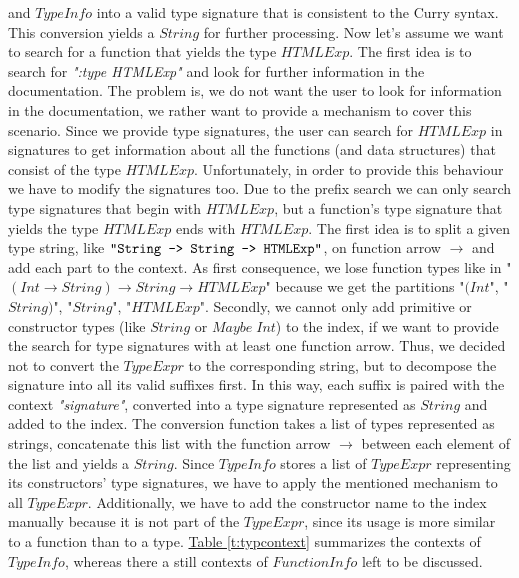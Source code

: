 \documentclass[%
	latex,%
	a4paper,%
	oneside,%
	chapterprefix,%
	headsepline,%
	12pt%
]{scrbook}
\newcommand{\textss}[1]{"#1"}
\newcommand{\Conid}[1]{\mathit{#1}}
\begin{document}
and \ensuremath{\Conid{TypeInfo}} into a valid type signature that is consistent to the
Curry syntax. %
This conversion yields a \ensuremath{\Conid{String}} for further processing. %
Now let's assume we want to search for a function that yields the type
\ensuremath{\Conid{HTMLExp}}. %
The first idea is to search for \emph{\textss{:type HTMLExp}} and look
for further information in the documentation. %
The problem is, we do not want the user to look for information in the
documentation, we rather want to provide a mechanism to cover this
scenario. %
Since we provide type signatures, the user can search for \ensuremath{\Conid{HTMLExp}} in
signatures to get information about all the functions (and data
structures) that consist of the type \ensuremath{\Conid{HTMLExp}}. %
Unfortunately, in order to provide this behaviour we have to modify
the signatures too. %
Due to the prefix search we can only search type signatures that begin
with \ensuremath{\Conid{HTMLExp}}, but a function's type signature that yields the type
\ensuremath{\Conid{HTMLExp}} ends with \ensuremath{\Conid{HTMLExp}}. %
The first idea is to split a given type string, like \ensuremath{\text{\tt \char34 String~->~String~->~HTMLExp\char34}}, on function arrow \ensuremath{\to } and add each part to the
context. %
As first consequence, we lose function types like in \textss{\ensuremath{(\Conid{Int}\to \Conid{String})\to \Conid{String}\to \Conid{HTMLExp}}} because we get the partitions \textss{\ensuremath{(\Conid{Int}}},
\textss{\ensuremath{\Conid{String})}}, \textss{\ensuremath{\Conid{String}}}, \textss{\ensuremath{\Conid{HTMLExp}}}. %
Secondly, we cannot only add primitive or constructor types (like
\ensuremath{\Conid{String}} or \ensuremath{\Conid{Maybe}\;\Conid{Int}}) to the index, if we want to provide the
search for type signatures with at least one function arrow. %
Thus, we decided not to convert the \ensuremath{\Conid{TypeExpr}} to the corresponding
string, but to decompose the signature into all its valid suffixes
first. %
In this way, each suffix is paired with the context
\emph{\textss{signature}}, converted into a type signature represented
as \ensuremath{\Conid{String}} and added to the index. The conversion function takes a
list of types represented as strings, concatenate this list with the
function arrow \ensuremath{\to } between each element of the list and yields a
\ensuremath{\Conid{String}}. %
Since \ensuremath{\Conid{TypeInfo}} stores a list of \ensuremath{\Conid{TypeExpr}} representing its
constructors' type signatures, we have to apply the mentioned
mechanism to all \ensuremath{\Conid{TypeExpr}}. %
Additionally, we have to add the constructor name to the index
manually because it is not part of the \ensuremath{\Conid{TypeExpr}}, since its usage is
more similar to a function than to a type. %
\hyperref[t:typcontext]{Table \ref{t:typcontext}} summarizes the
contexts of \ensuremath{\Conid{TypeInfo}}, whereas there a still contexts of
\ensuremath{\Conid{FunctionInfo}} left to be discussed. %
\end{document}
